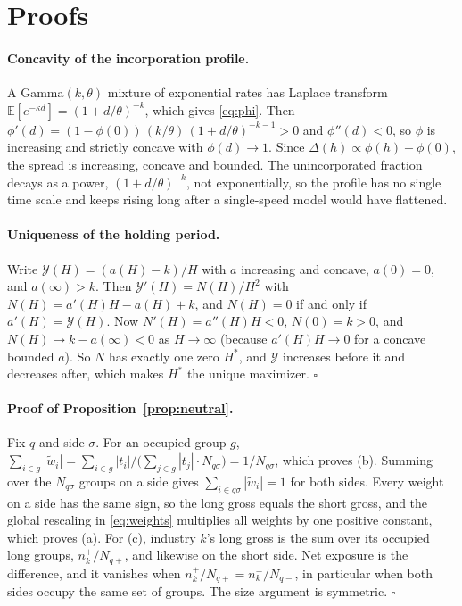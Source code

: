 \documentclass[11pt]{article}
\theoremstyle{definition}
\newcommand{\E}{\mathbb{E}}
\newcommand{\1}{\mathbf{1}}
\begin{document}
\appendix
\section{Proofs}\label{app:proofs}

\paragraph{Concavity of the incorporation profile.}
A Gamma$(k,\theta)$ mixture of exponential rates has Laplace transform
$\E[e^{-\kappa d}]=(1+d/\theta)^{-k}$, which gives \eqref{eq:phi}. Then
$\phi'(d)=(1-\phi(0))\,(k/\theta)\,(1+d/\theta)^{-k-1}>0$ and $\phi''(d)<0$, so $\phi$ is
increasing and strictly concave with $\phi(d)\to1$. Since $\Delta(h)\propto\phi(h)-\phi(0)$,
the spread is increasing, concave and bounded. The unincorporated fraction decays as a
power, $(1+d/\theta)^{-k}$, not exponentially, so the profile has no single time scale and
keeps rising long after a single-speed model would have flattened.

\paragraph{Uniqueness of the holding period.}
Write $\mathcal Y(H)=(a(H)-k)/H$ with $a$ increasing and concave, $a(0)=0$, and
$a(\infty)>k$. Then $\mathcal Y'(H)=N(H)/H^2$ with $N(H)=a'(H)H-a(H)+k$, and $N(H)=0$ if and
only if $a'(H)=\mathcal Y(H)$. Now $N'(H)=a''(H)H<0$, $N(0)=k>0$, and
$N(H)\to k-a(\infty)<0$ as $H\to\infty$ (because $a'(H)H\to0$ for a concave bounded $a$).
So $N$ has exactly one zero $H^\ast$, and $\mathcal Y$ increases before it and decreases after,
which makes $H^\ast$ the unique maximizer. $\square$

\paragraph{Proof of Proposition~\ref{prop:neutral}.}
Fix $q$ and side $\sigma$. For an occupied group $g$,
$\sum_{i\in g}|\tilde w_i|=\sum_{i\in g}|t_i|\big/\big(\sum_{j\in g}|t_j|\cdot N_{q\sigma}\big)=1/N_{q\sigma}$,
which proves (b). Summing over the $N_{q\sigma}$ groups on a side gives
$\sum_{i\in q\sigma}|\tilde w_i|=1$ for both sides. Every weight on a side has the same sign,
so the long gross equals the short gross, and the global rescaling in \eqref{eq:weights}
multiplies all weights by one positive constant, which proves (a). For (c), industry $k$'s
long gross is the sum over its occupied long groups, $n^+_k/N_{q+}$, and likewise on the short
side. Net exposure is the difference, and it vanishes when $n^{+}_{k}/N_{q+}=n^{-}_{k}/N_{q-}$,
in particular when both sides occupy the same set of groups. The size argument is symmetric. $\square$
\end{document}
